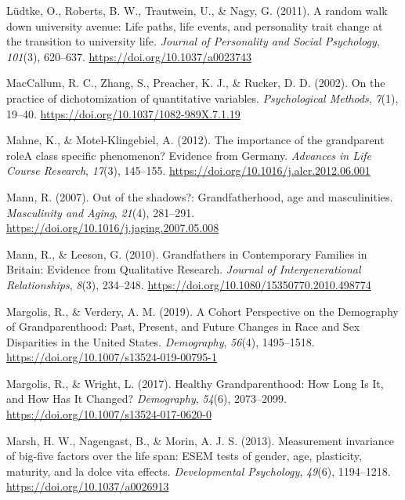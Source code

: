 \documentclass[
  english,
  man,floatsintext]{apa7}
\begin{document}
\leavevmode\hypertarget{ref-ludtkeRandomWalkUniversity2011}{}%
Lüdtke, O., Roberts, B. W., Trautwein, U., \& Nagy, G. (2011). A random walk down university avenue: Life paths, life events, and personality trait change at the transition to university life. \emph{Journal of Personality and Social Psychology}, \emph{101}(3), 620--637. \url{https://doi.org/10.1037/a0023743}

\leavevmode\hypertarget{ref-maccallumPracticeDichotomizationQuantitative2002}{}%
MacCallum, R. C., Zhang, S., Preacher, K. J., \& Rucker, D. D. (2002). On the practice of dichotomization of quantitative variables. \emph{Psychological Methods}, \emph{7}(1), 19--40. \url{https://doi.org/10.1037/1082-989X.7.1.19}

\leavevmode\hypertarget{ref-mahneImportanceGrandparentRole2012}{}%
Mahne, K., \& Motel-Klingebiel, A. (2012). The importance of the grandparent roleA class specific phenomenon? Evidence from Germany. \emph{Advances in Life Course Research}, \emph{17}(3), 145--155. \url{https://doi.org/10.1016/j.alcr.2012.06.001}

\leavevmode\hypertarget{ref-mannOutShadowsGrandfatherhood2007}{}%
Mann, R. (2007). Out of the shadows?: Grandfatherhood, age and masculinities. \emph{Masculinity and Aging}, \emph{21}(4), 281--291. \url{https://doi.org/10.1016/j.jaging.2007.05.008}

\leavevmode\hypertarget{ref-mannGrandfathersContemporaryFamilies2010}{}%
Mann, R., \& Leeson, G. (2010). Grandfathers in Contemporary Families in Britain: Evidence from Qualitative Research. \emph{Journal of Intergenerational Relationships}, \emph{8}(3), 234--248. \url{https://doi.org/10.1080/15350770.2010.498774}

\leavevmode\hypertarget{ref-margolisCohortPerspectiveDemography2019}{}%
Margolis, R., \& Verdery, A. M. (2019). A Cohort Perspective on the Demography of Grandparenthood: Past, Present, and Future Changes in Race and Sex Disparities in the United States. \emph{Demography}, \emph{56}(4), 1495--1518. \url{https://doi.org/10.1007/s13524-019-00795-1}

\leavevmode\hypertarget{ref-margolisHealthyGrandparenthoodHow2017}{}%
Margolis, R., \& Wright, L. (2017). Healthy Grandparenthood: How Long Is It, and How Has It Changed? \emph{Demography}, \emph{54}(6), 2073--2099. \url{https://doi.org/10.1007/s13524-017-0620-0}

\leavevmode\hypertarget{ref-marshMeasurementInvarianceBigfive2013}{}%
Marsh, H. W., Nagengast, B., \& Morin, A. J. S. (2013). Measurement invariance of big-five factors over the life span: ESEM tests of gender, age, plasticity, maturity, and la dolce vita effects. \emph{Developmental Psychology}, \emph{49}(6), 1194--1218. \url{https://doi.org/10.1037/a0026913}
\end{document}
